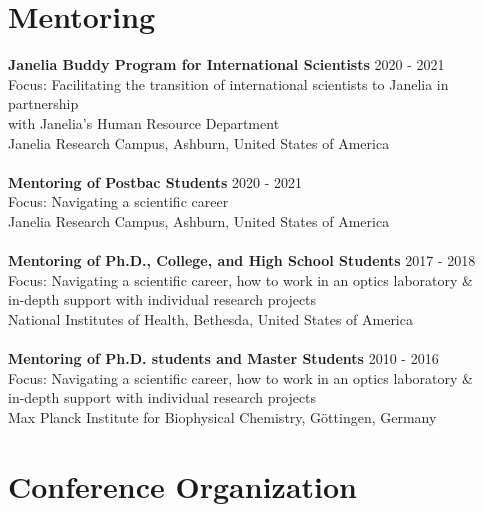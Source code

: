 \documentclass[margin,line]{res}
\begin{document}
\begin{resume}

\section{\sc Mentoring}

{\bf  Janelia Buddy Program for International Scientists} \hfill 2020 - 2021\\
Focus: Facilitating the transition of international scientists to Janelia in partnership \\
with Janelia's Human Resource Department\\
Janelia Research Campus, Ashburn, United States of America\\
\vspace*{-3mm}\\
{\bf  Mentoring of Postbac Students} \hfill 2020 - 2021\\
Focus: Navigating a scientific career\\
Janelia Research Campus, Ashburn, United States of America\\
\vspace*{-3mm}\\
{\bf  Mentoring of Ph.D., College, and High School Students}  \hfill 2017 - 2018\\
Focus: Navigating a scientific career, how to work in an optics laboratory \&\\
in-depth support with individual research projects\\
National Institutes of Health, Bethesda, United States of America\\
\vspace*{-3mm}\\
{\bf Mentoring of Ph.D. students and Master Students}  \hfill {2010 - 2016}\\
Focus: Navigating a scientific career, how to work in an optics laboratory \&\\
in-depth support with individual research projects\\
Max Planck Institute for Biophysical Chemistry, Göttingen, Germany \\


\section{\sc Conference Organization}


\end{resume}
\end{document}
